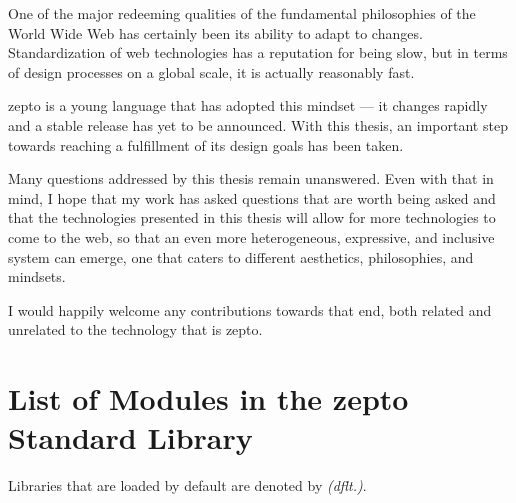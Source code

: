 \documentclass[oneside,11pt,xetex]{scrbook}
\begin{document}
One of the major redeeming qualities of the fundamental
philosophies of the World Wide Web has certainly been
its ability to adapt to changes. Standardization of web
technologies has a reputation for being slow, but in terms
of design processes on a global scale, it is actually reasonably
fast.

zepto is a young language that has adopted this mindset ---
it changes rapidly and a stable release has yet to be announced.
With this thesis, an important step towards reaching a fulfillment
of its design goals has been taken.

Many questions addressed by this thesis remain unanswered.
Even with that in mind, I hope that my work has asked
questions that are worth being asked and that the technologies
presented in this thesis will allow for more technologies to
come to the web, so that an even more heterogeneous,
expressive, and inclusive system can emerge, one that
caters to different aesthetics, philosophies, and mindsets.

I would happily welcome any contributions towards that
end, both related and unrelated to the technology
that is zepto.



\appendix

\chapter{List of Modules in the zepto Standard Library}
\label{app:stdlib}

Libraries that are loaded by default are denoted by \textit{(dflt.)}.
\end{document}
